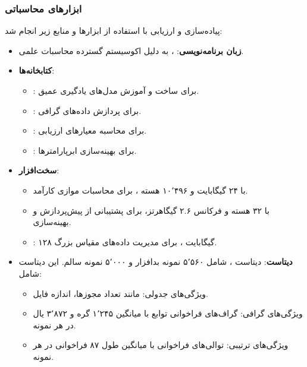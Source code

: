 \subsubsection{ابزارهای محاسباتی}
پیاده‌سازی و ارزیابی  با استفاده از ابزارها و منابع زیر انجام شد:
\begin{itemize}
    \renewcommand{\labelitemi}{\lr{$\bullet$}}
    \item \textbf{زبان برنامه‌نویسی}: ، به دلیل اکوسیستم گسترده محاسبات علمی.
    \item \textbf{کتابخانه‌ها}:
        \begin{itemize}
            \renewcommand{\labelitemii}{\lr{$\bullet$}}
            \item {}: برای ساخت و آموزش مدل‌های یادگیری عمیق.
            \item {}: برای پردازش داده‌های گرافی.
            \item {}: برای محاسبه معیارهای ارزیابی.
            \item {}: برای بهینه‌سازی ابرپارامترها.
        \end{itemize}
    \item \textbf{سخت‌افزار}:
        \begin{itemize}
            \renewcommand{\labelitemii}{\lr{$\bullet$}}
            \item {} با ۲۴ گیگابایت  و ۱۰٬۴۹۶ هسته ، برای محاسبات موازی کارآمد.
            \item {} با ۳۲ هسته و فرکانس ۲.۶ گیگاهرتز، برای پشتیبانی از پیش‌پردازش و بهینه‌سازی.
            \item {}: ۱۲۸ گیگابایت ، برای مدیریت داده‌های مقیاس بزرگ.
        \end{itemize}
    \item \textbf{دیتاست}: دیتاست  \cite{Drebin}، شامل ۵٬۵۶۰ نمونه بدافزار و ۵٬۰۰۰ نمونه سالم. این دیتاست شامل:
        \begin{itemize}
            \renewcommand{\labelitemii}{\lr{$\bullet$}}
            \item ویژگی‌های جدولی: مانند تعداد مجوزها، اندازه فایل.
            \item ویژگی‌های گرافی: گراف‌های فراخوانی توابع با میانگین ۱٬۲۴۵ گره و ۳٬۸۷۲ یال در هر نمونه.
            \item ویژگی‌های ترتیبی: توالی‌های فراخوانی  با میانگین طول ۸۷ فراخوانی در هر نمونه.
        \end{itemize}
\end{itemize}

